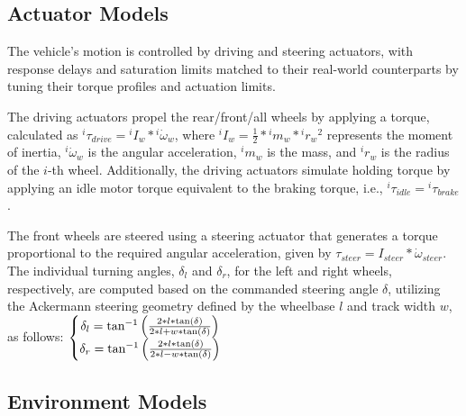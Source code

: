 \documentclass[letterpaper, 10 pt, conference]{ieeeconf}  %
\begin{document}
\subsection{Actuator Models}
\label{Sub-Section: Actuator Models}

The vehicle's motion is controlled by driving and steering actuators, with response delays and saturation limits matched to their real-world counterparts by tuning their torque profiles and actuation limits.

The driving actuators propel the rear/front/all wheels by applying a torque, calculated as ${^i\tau_{drive}} = {^iI_w}*{^i\dot{\omega}_w}$, where ${^iI_w} = \frac{1}{2}*{^im_w}*{^i{r_w}^2}$ represents the moment of inertia, $^i\dot{\omega}_w$ is the angular acceleration, $^im_w$ is the mass, and $^ir_w$ is the radius of the $i$-th wheel. Additionally, the driving actuators simulate holding torque by applying an idle motor torque equivalent to the braking torque, i.e., ${^i\tau_{idle}} = {^i\tau_{brake}}$.

The front wheels are steered using a steering actuator that generates a torque proportional to the required angular acceleration, given by $\tau_{steer} = I_{steer}*\dot{\omega}_{steer}$. The individual turning angles, $\delta_l$ and $\delta_r$, for the left and right wheels, respectively, are computed based on the commanded steering angle $\delta$, utilizing the Ackermann steering geometry defined by the wheelbase $l$ and track width $w$, as follows: $\left\{\begin{matrix} \delta_l = \textup{tan}^{-1}\left(\frac{2*l*\textup{tan}(\delta)}{2*l+w*\textup{tan}(\delta)}\right) \\ \delta_r = \textup{tan}^{-1}\left(\frac{2*l*\textup{tan}(\delta)}{2*l-w*\textup{tan}(\delta)}\right) \end{matrix}\right.$

\subsection{Environment Models}
\label{Sub-Section: Environment Models}
\end{document}
